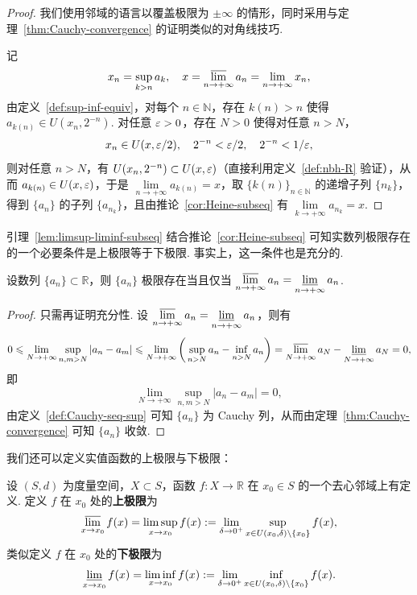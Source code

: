 \documentclass[../main.tex]{subfiles}
\begin{document}
\begin{proof}
    我们使用邻域的语言以覆盖极限为 $\pm\infty$ 的情形，同时采用与定理~\ref{thm:Cauchy-convergence} 的证明类似的对角线技巧. 

    记 
    $$
    x_n = \sup\limits_{k > n} a_k,\quad x = \varlimsup\limits_{n \to +\infty} a_n = \lim\limits_{n \to +\infty} x_n, 
    $$
    由定义~\ref{def:sup-inf-equiv}，对每个 $n \in \mathbb N$，存在 $k(n) > n$ 使得 $a_{k(n)} \in U(x_n, 2^{-n})$. 对任意 $\varepsilon > 0$，存在 $N > 0$ 使得对任意 $n > N$，
    $$
    x_n \in U(x, \varepsilon / 2),\quad 2^{-n} < \varepsilon / 2,\quad 2^{-n} < 1 / \varepsilon, 
    $$
    则对任意 $n > N$，有 $U(x_n, 2^{-n}) \subset U(x, \varepsilon)$（直接利用定义~\ref{def:nbh-R} 验证），从而 $a_{k(n)} \in U(x, \varepsilon)$，于是 $\lim\limits_{n \to +\infty} a_{k(n)} = x$，取 $\{k(n)\}_{n \in \mathbb N}$ 的递增子列 $\{n_k\}$，得到 $\{a_n\}$ 的子列 $\{a_{n_k}\}$，且由推论~\ref{cor:Heine-subseq} 有 $\lim\limits_{k \to +\infty} a_{n_k} = x$. 
\end{proof}

引理~\ref{lem:limsup-liminf-subseq} 结合推论~\ref{cor:Heine-subseq} 可知实数列极限存在的一个必要条件是上极限等于下极限. 事实上，这一条件也是充分的. 

\begin{proposition}
    设数列 $\{a_n\} \subset \mathbb R$，则 $\{a_n\}$ 极限存在当且仅当 $\varlimsup\limits_{n \to +\infty} a_n = \varliminf\limits_{n \to +\infty} a_n$. 
\end{proposition}

\begin{proof}
    只需再证明充分性. 设 $\varlimsup\limits_{n \to +\infty} a_n = \varliminf\limits_{n \to +\infty} a_n$，则有
    \begin{align*}
        0 \leqslant \lim_{N \to +\infty} \sup_{n, m > N} |a_n - a_m| \leqslant \lim_{N \to +\infty} \bigg( \sup_{n > N} a_n - \inf_{n > N} a_n \bigg) = \varlimsup\limits_{N \to +\infty} a_N - \varliminf\limits_{N \to +\infty} a_N = 0, 
    \end{align*}
    即
    $$
    \lim_{N \to +\infty} \sup_{n, m > N} |a_n - a_m| = 0, 
    $$
    由定义~\ref{def:Cauchy-seq-sup} 可知 $\{a_n\}$ 为 Cauchy 列，从而由定理~\ref{thm:Cauchy-convergence} 可知 $\{a_n\}$ 收敛. 
\end{proof}

我们还可以定义实值函数的上极限与下极限：

\begin{definition}[函数的上极限与下极限的定义]
    设 $(S, d)$ 为度量空间，$X \subset S$，函数 $f:X \to \mathbb R$ 在 $x_0 \in S$ 的一个去心邻域上有定义. 定义 $f$ 在 $x_0$ 处的\textbf{上极限}为
    $$
    \varlimsup_{x \to x_0} f(x) = \limsup_{x \to x_0} f(x) := \lim_{\delta \to 0^+} \sup_{x \in U(x_0, \delta) \setminus \{x_0\}} f(x), 
    $$
    类似定义 $f$ 在 $x_0$ 处的\textbf{下极限}为
    $$
    \varliminf_{x \to x_0} f(x) = \liminf_{x \to x_0} f(x) := \lim_{\delta \to 0^+} \inf_{x \in U(x_0, \delta) \setminus \{x_0\}} f(x). 
    $$
\end{definition}
\end{document}
